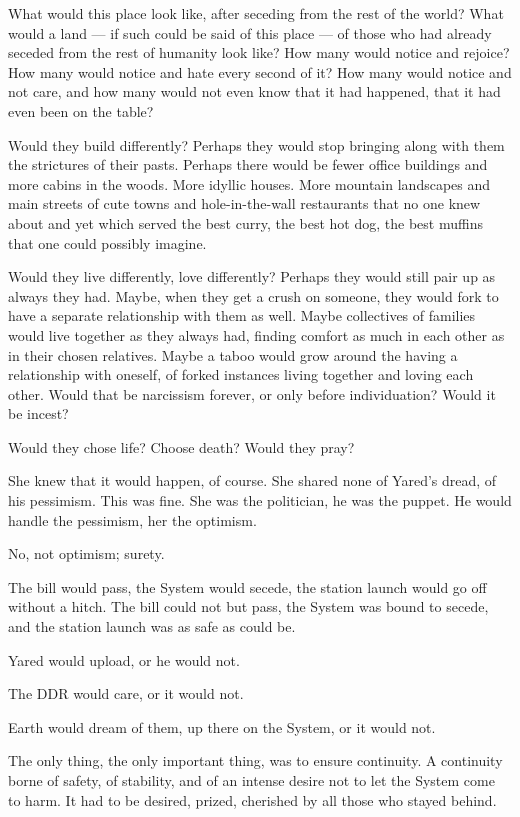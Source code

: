 What would this place look like, after seceding from the rest of the world? What would a land — if such could be said of this place — of those who had already seceded from the rest of humanity look like? How many would notice and rejoice? How many would notice and hate every second of it? How many would notice and not care, and how many would not even know that it had happened, that it had even been on the table?

Would they build differently? Perhaps they would stop bringing along with them the strictures of their pasts. Perhaps there would be fewer office buildings and more cabins in the woods. More idyllic houses. More mountain landscapes and main streets of cute towns and hole-in-the-wall restaurants that no one knew about and yet which served the best curry, the best hot dog, the best muffins that one could possibly imagine.

Would they live differently, love differently? Perhaps they would still pair up as always they had. Maybe, when they get a crush on someone, they would fork to have a separate relationship with them as well. Maybe collectives of families would live together as they always had, finding comfort as much in each other as in their chosen relatives. Maybe a taboo would grow around the having a relationship with oneself, of forked instances living together and loving each other. Would that be narcissism forever, or only before individuation? Would it be incest?

Would they chose life? Choose death? Would they pray?

She knew that it would happen, of course. She shared none of Yared's dread, of his pessimism. This was fine. She was the politician, he was the puppet. He would handle the pessimism, her the optimism.

No, not optimism; surety.

The bill would pass, the System would secede, the station launch would go off without a hitch. The bill could not but pass, the System was bound to secede, and the station launch was as safe as could be.

Yared would upload, or he would not.

The DDR would care, or it would not.

Earth would dream of them, up there on the System, or it would not.

The only thing, the only important thing, was to ensure continuity. A continuity borne of safety, of stability, and of an intense desire not to let the System come to harm. It had to be desired, prized, cherished by all those who stayed behind.


